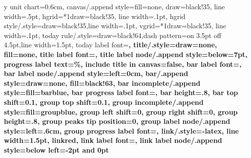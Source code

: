 \usepackage{scrlayer-scrpage}
\clearscrheadings
\clearscrheadfoot
{}
\ohead{\pagemark}
\ihead{\headmark}
\pagestyle{scrheadings}

\usepackage[breaklinks,hyperindex,colorlinks,anchorcolor=black,citecolor=black,filecolor=black,linkcolor=black,menucolor=black,urlcolor=black,pdftex]{hyperref} %
\addto{}

\makeatletter
{}


\sffamily
\ganttset
{%
	y unit chart=0.6cm,
	canvas/.append style={fill=none, draw=black!35, line width=.5pt},
	hgrid={*1{draw=black!35, line width=.1pt}},
	hgrid style/.style={draw=black!35,line width=.1pt},
	vgrid={*1{draw=black!35, line width=.1pt}},
	today rule/.style={draw=black!64,dash pattern=on 3.5pt off 4.5pt,line width=1.5pt},
	today label font=\small\bfseries,
	title/.style={draw=none, fill=none},
	title label font=\bfseries\footnotesize,
	title label node/.append style={below=7pt},
	progress label text={\%},
	include title in canvas=false,
	bar label font=\mdseries\small\color{black!70},
	bar label node/.append style={left=0cm},
	bar/.append style={draw=none, fill=black!63},
	bar incomplete/.append style={fill=barblue},
	bar progress label font=\mdseries\footnotesize\color{black!70},
	bar height=.8,
	bar top shift=0.1,
	group top shift=0.1,
	group incomplete/.append style={fill=groupblue},
	group left shift=0,
	group right shift=0,
	group height=.8,
	group peaks tip position=0,
	group label node/.append style={left=.6cm},
	group progress label font=\bfseries\small,
	link/.style={-latex, line width=1.5pt, linkred},
	link label font=\scriptsize\bfseries,
	link label node/.append style={below left=-2pt and 0pt}
}